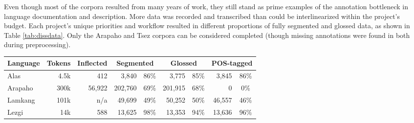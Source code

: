 Even though most of the corpora resulted from many years of work, they still stand as prime examples of the annotation bottleneck in language documentation and description. More data was recorded and transcribed than could be interlinearized within the project's budget. Each project's unique priorities and workflow resulted in different proportions of fully segmented and glossed data, as shown in Table \ref{tab:dissdata}.
Only the Arapaho and Tsez corpora can be considered completed (though missing annotations were found in both during preprocessing). 


\begin{table}[tb]
    \centering
    \begin{tabular}{l|r|r|rc|rc|rc}
         \textbf{Language} & \textbf{Tokens} & \textbf{Inflected} & \multicolumn{2}{c|}{\textbf{Segmented}} & \multicolumn{2}{c|}{\textbf{Glossed}} & \multicolumn{2}{c}{\textbf{POS-tagged}} \\
         \hline
         Alas & 4.5k  & 412 & 3,840 & 86\% & 3,775 & 85\% & 3,845  & 86\% \\
         \hline
         Arapaho & 300k &  56,922 & 202,760 & 69\%  & 201,915 & 68\% & 0  & 0\%  \\
         \hline
         Lamkang & 101k & n/a & 49,699 & 49\%  & 50,252 & 50\% & 46,557 & 46\% \\
         \hline
         Lezgi & 14k & 588 & 13,625  & 98\%  & 13,353  &  94\% & 13,636 & 96\%  \\

\end{tabular}
\end{table}
